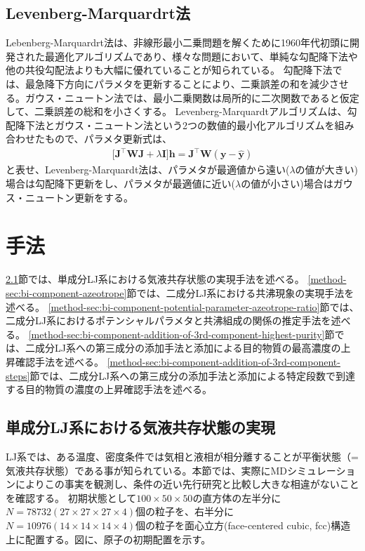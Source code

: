 \documentclass[titlepage]{jsreport}
\begin{document}
\section{Levenberg-Marquardrt法}\label{principle-sec:levenberg-marquardt}
Lebenberg-Marquardrt法は、非線形最小二乗問題を解くために1960年代初頭に開発された最適化アルゴリズムであり、様々な問題において、単純な勾配降下法や他の共役勾配法よりも大幅に優れていることが知られている\cite{levenberg-marquardt}。
勾配降下法では、最急降下方向にパラメタを更新することにより、二乗誤差の和を減少させる。ガウス・ニュートン法では、最小二乗関数は局所的に二次関数であると仮定して、二乗誤差の総和を小さくする。
Levenberg-Marquardtアルゴリズムは、勾配降下法とガウス・ニュートン法という2つの数値的最小化アルゴリズムを組み合わせたもので、パラメタ更新式は、
\large
\begin{eqnarray}
\Big[\bm{J}^\top\bm{W}\bm{J}+\lambda\bm{I}\Big]\bm{h} = \bm{J}^\top\bm{W}(\bm{y}-\bm{\hat{y}})
\end{eqnarray}
\normalsize
と表せ、Levenberg-Marquardt法は、パラメタが最適値から遠い($\lambda$の値が大きい)場合は勾配降下更新をし、パラメタが最適値に近い($\lambda$の値が小さい)場合はガウス・ニュートン更新をする\cite{gradient-descent_gauss-newton_levenberg-marquardt}。


\chapter{手法} \label{chap:method}
\ref{method-sec:mono-component}節では、単成分LJ系における気液共存状態の実現手法を述べる。
\ref{method-sec:bi-component-azeotrope}節では、二成分LJ系における共沸現象の実現手法を述べる。
\ref{method-sec:bi-component-potential-parameter-azeotrope-ratio}節では、二成分LJ系におけるポテンシャルパラメタと共沸組成の関係の推定手法を述べる。
\ref{method-sec:bi-component-addition-of-3rd-component-highest-purity}節では、二成分LJ系への第三成分の添加手法と添加による目的物質の最高濃度の上昇確認手法を述べる。
\ref{method-sec:bi-component-addition-of-3rd-component-steps}節では、二成分LJ系への第三成分の添加手法と添加による特定段数で到達する目的物質の濃度の上昇確認手法を述べる。


\section{単成分LJ系における気液共存状態の実現} \label{method-sec:mono-component}
LJ系では、ある温度、密度条件では気相と液相が相分離することが平衡状態（=気液共存状態）である事が知られている\cite{gas-liquid-equilibrium}。本節では、実際にMDシミュレーションによりこの事実を観測し、条件の近い先行研究と比較し大きな相違がないことを確認する。
初期状態として$100×50×50$の直方体の左半分に$N=78732(27×27×27×4)$個の粒子を、右半分に$N=10976(14×14×14×4)$個の粒子を面心立方(face-centered cubic, fcc)構造上に配置する。図に、原子の初期配置を示す。
\end{document}
